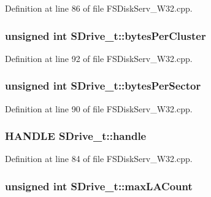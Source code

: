 Definition at line 86 of file FSDiskServ\_\-W32.cpp.\hypertarget{struct_s_drive__t_a294ea64310e043f9891336769bdbfa6}{
\subsubsection[{bytesPerCluster}]{\setlength{\rightskip}{0pt plus 5cm}unsigned int {\bf SDrive\_\-t::bytesPerCluster}}}
\label{struct_s_drive__t_a294ea64310e043f9891336769bdbfa6}




Definition at line 92 of file FSDiskServ\_\-W32.cpp.\hypertarget{struct_s_drive__t_c54a18e038048b9de16430fdcaa62019}{
\subsubsection[{bytesPerSector}]{\setlength{\rightskip}{0pt plus 5cm}unsigned int {\bf SDrive\_\-t::bytesPerSector}}}
\label{struct_s_drive__t_c54a18e038048b9de16430fdcaa62019}




Definition at line 90 of file FSDiskServ\_\-W32.cpp.\hypertarget{struct_s_drive__t_87d7bbf6cb8757f07cdeba13f05cf087}{
\subsubsection[{handle}]{\setlength{\rightskip}{0pt plus 5cm}HANDLE {\bf SDrive\_\-t::handle}}}
\label{struct_s_drive__t_87d7bbf6cb8757f07cdeba13f05cf087}




Definition at line 84 of file FSDiskServ\_\-W32.cpp.\hypertarget{struct_s_drive__t_9751e7f3772821f7eb220fd9f36475e5}{
\subsubsection[{maxLACount}]{\setlength{\rightskip}{0pt plus 5cm}unsigned int {\bf SDrive\_\-t::maxLACount}}}
\label{struct_s_drive__t_9751e7f3772821f7eb220fd9f36475e5}




